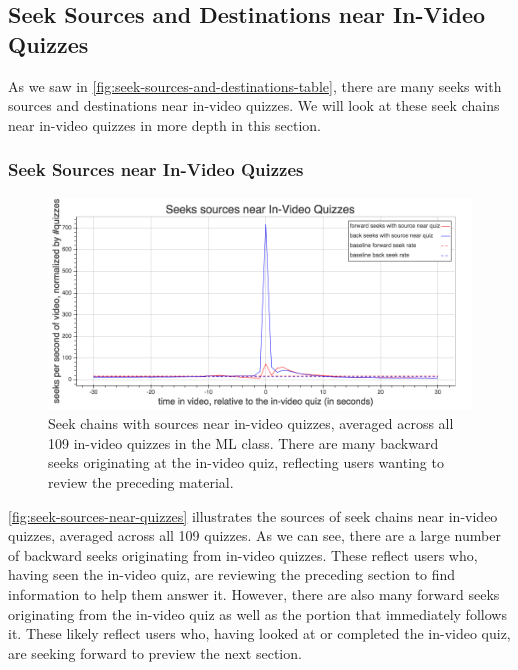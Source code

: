 \documentclass{sigchi}
\begin{document}
\subsection{Seek Sources and Destinations near In-Video Quizzes}

As we saw in \autoref{fig:seek-sources-and-destinations-table}, there are many seeks with sources and destinations near in-video quizzes. We will look at these seek chains near in-video quizzes in more depth in this section.

\subsubsection{Seek Sources near In-Video Quizzes}

\begin{figure}
\includegraphics[width=1.0\columnwidth]{seek-sources-near-quizzes}
\caption{Seek chains with sources near in-video quizzes, averaged across all 109 in-video quizzes in the ML class. There are many backward seeks originating at the in-video quiz, reflecting users wanting to review the preceding material.}
\label{fig:seek-sources-near-quizzes}
\end{figure}

\autoref{fig:seek-sources-near-quizzes} illustrates the sources of seek chains near in-video quizzes, averaged across all 109 quizzes. As we can see, there are a large number of backward seeks originating from in-video quizzes. These reflect users who, having seen the in-video quiz, are reviewing the preceding section to find information to help them answer it. However, there are also many forward seeks originating from the in-video quiz as well as the portion that immediately follows it. These likely reflect users who, having looked at or completed the in-video quiz, are seeking forward to preview the next section.
\end{document}
